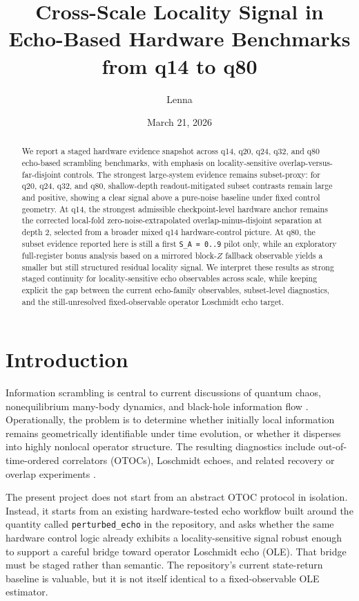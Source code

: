 \documentclass[11pt]{article}
\title{Cross-Scale Locality Signal in Echo-Based Hardware Benchmarks from q14 to q80}
\author{Lenna}
\date{March 21, 2026}
\begin{document}
\maketitle

\begin{abstract}
We report a staged hardware evidence snapshot across q14, q20, q24, q32, and q80 echo-based scrambling benchmarks, with emphasis on locality-sensitive overlap-versus-far-disjoint controls. The strongest large-system evidence remains subset-proxy: for q20, q24, q32, and q80, shallow-depth readout-mitigated subset contrasts remain large and positive, showing a clear signal above a pure-noise baseline under fixed control geometry. At q14, the strongest admissible checkpoint-level hardware anchor remains the corrected local-fold zero-noise-extrapolated overlap-minus-disjoint separation at depth 2, selected from a broader mixed q14 hardware-control picture. At q80, the subset evidence reported here is still a first \texttt{S\_A = 0..9} pilot only, while an exploratory full-register bonus analysis based on a mirrored block-$Z$ fallback observable yields a smaller but still structured residual locality signal. We interpret these results as strong staged continuity for locality-sensitive echo observables across scale, while keeping explicit the gap between the current echo-family observables, subset-level diagnostics, and the still-unresolved fixed-observable operator Loschmidt echo target.
\end{abstract}

\section{Introduction}

Information scrambling is central to current discussions of quantum chaos, nonequilibrium many-body dynamics, and black-hole information flow
\cite{hayden2007blackholes,sekino2008fast,maldacena2016bound}.
Operationally, the problem is to determine whether initially local information remains geometrically identifiable under time evolution, or whether it disperses into highly nonlocal operator structure.
The resulting diagnostics include out-of-time-ordered correlators (OTOCs), Loschmidt echoes, and related recovery or overlap experiments
\cite{yan2020information,vermersch2019probing,mi2021scrambling}.

The present project does not start from an abstract OTOC protocol in isolation.
Instead, it starts from an existing hardware-tested echo workflow built around the quantity called \texttt{perturbed\_echo} in the repository, and asks whether the same hardware control logic already exhibits a locality-sensitive signal robust enough to support a careful bridge toward operator Loschmidt echo (OLE).
That bridge must be staged rather than semantic.
The repository's current state-return baseline is valuable, but it is not itself identical to a fixed-observable OLE estimator.
\end{document}
